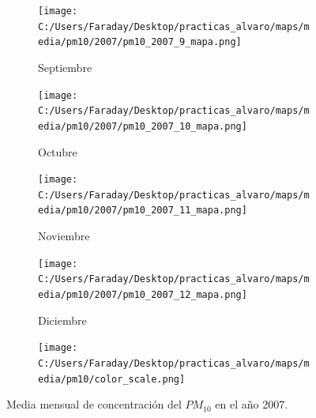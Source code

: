 \documentclass[12pt]{beamer}
\begin{document}
\begin{frame}[squeeze]
\begin{figure}[H]
\begin{subfigure}[H]{0.20\textwidth}
\texttt{[image: C:/Users/Faraday/Desktop/practicas\_alvaro/maps/media/pm10/2007/pm10\_2007\_9\_mapa.png]}
\captionsetup{labelformat=empty}
\caption{\scriptsize Septiembre}
\label{fig:map-pm10-2007-9}
\end{subfigure}
%
\begin{subfigure}[H]{0.20\textwidth}
\texttt{[image: C:/Users/Faraday/Desktop/practicas\_alvaro/maps/media/pm10/2007/pm10\_2007\_10\_mapa.png]}
\captionsetup{labelformat=empty}
\caption{\scriptsize Octubre}
\label{fig:map-pm10-2007-10}
\end{subfigure}
%
\begin{subfigure}[H]{0.20\textwidth}
\texttt{[image: C:/Users/Faraday/Desktop/practicas\_alvaro/maps/media/pm10/2007/pm10\_2007\_11\_mapa.png]}
\captionsetup{labelformat=empty}
\caption{\scriptsize Noviembre}
\label{fig:map-pm10-2007-11}
\end{subfigure}
%
\begin{subfigure}[H]{0.20\textwidth}
\texttt{[image: C:/Users/Faraday/Desktop/practicas\_alvaro/maps/media/pm10/2007/pm10\_2007\_12\_mapa.png]}
\captionsetup{labelformat=empty}
\caption{\scriptsize Diciembre}
\label{fig:map-pm10-2007-12}
\end{subfigure}

\begin{subfigure}[H]{0.45\textwidth}
\texttt{[image: C:/Users/Faraday/Desktop/practicas\_alvaro/maps/media/pm10/color\_scale.png]}
\captionsetup{labelformat=empty}
\caption{}
\end{subfigure}

\vspace*{-7mm}
\caption{\scriptsize Media mensual de concentración del $PM_{10}$ en el año 2007.}
\label{fig:map-pm10-2007}
\end{figure}
\end{frame}
\end{document}
